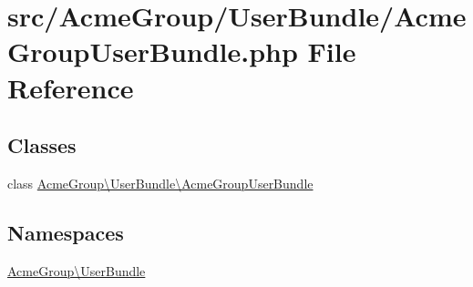 \hypertarget{_acme_group_user_bundle_8php}{\section{src/\+Acme\+Group/\+User\+Bundle/\+Acme\+Group\+User\+Bundle.php File Reference}
\label{_acme_group_user_bundle_8php}
}
\subsection*{Classes}
\begin{DoxyCompactItemize}
\item 
class \hyperlink{class_acme_group_1_1_user_bundle_1_1_acme_group_user_bundle}{Acme\+Group\textbackslash{}\+User\+Bundle\textbackslash{}\+Acme\+Group\+User\+Bundle}
\end{DoxyCompactItemize}
\subsection*{Namespaces}
\begin{DoxyCompactItemize}
\item 
 \hyperlink{namespace_acme_group_1_1_user_bundle}{Acme\+Group\textbackslash{}\+User\+Bundle}
\end{DoxyCompactItemize}
